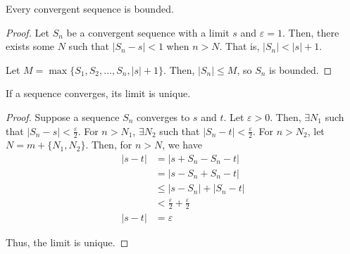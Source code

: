 \begin{theorem}
    Every convergent sequence is bounded.
\end{theorem}
\begin{proof}
    Let $S_n$ be a convergent sequence with a limit $s$ and $\varepsilon = 1$. Then, there exists some $N$ such that $|S_n - s| < 1$ when $n > N$. That is, $|S_n| < |s| + 1$.

    Let $M = \max\{S_1, S_2, \ldots, S_n, |s| + 1\}$. Then, $|S_n| \leq M$, so $S_n$ is bounded.
\end{proof}

\begin{theorem}
    If a sequence converges, its limit is unique.
\end{theorem}
\begin{proof}
    Suppose a sequence $S_n$ converges to $s$ and $t$. Let $\varepsilon > 0$. Then, $\exists N_1$ such that $|S_n - s| < \frac{\varepsilon}{2}$. For $n > N_1$, $\exists N_2$ such that $|S_n - t| < \frac{\varepsilon}{2}$. For $n > N_2$, let $N = m + \{N_1, N_2\}$. Then, for $n > N$, we have
    \begin{align*}
        |s - t| &= |s + S_n - S_n - t| \\
        &= |s - S_n + S_n - t| \\
        &\leq |s - S_n| + |S_n - t| \\
        &< \frac{\varepsilon}{2} + \frac{\varepsilon}{2} \\
        |s - t| &= \varepsilon
    \end{align*}

    Thus, the limit is unique.
\end{proof}